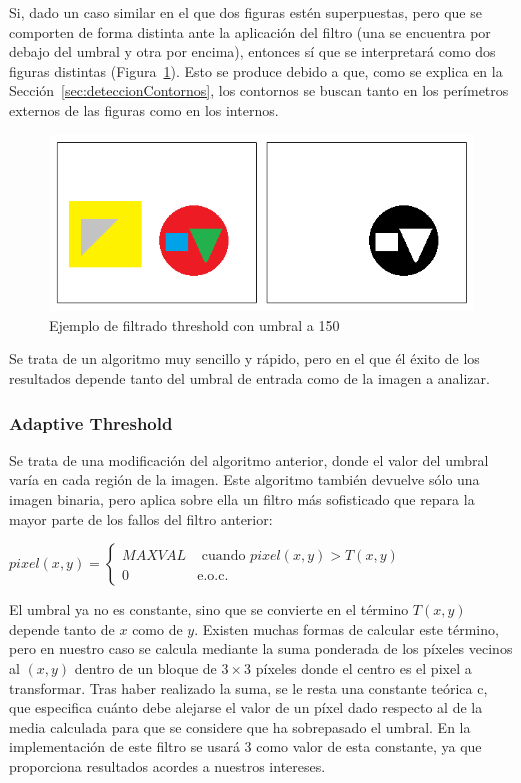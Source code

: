 {	Si, dado un caso similar en el que dos figuras estén superpuestas, pero que se comporten de forma distinta ante la aplicación del filtro (una se encuentra por debajo del umbral y otra por encima), entonces sí que se interpretará como dos figuras distintas (Figura~\ref{fig:threshold2}). Esto se produce debido a que, como se explica en la Sección~\ref{sec:deteccionContornos}, los contornos se buscan tanto en los perímetros externos de las figuras como en los internos.
	
		\begin{figure}[!htbp]
		\centering
		\includegraphics[scale=0.47]{graphics/threshold2.png}
		\caption{Ejemplo de filtrado threshold con umbral a 150}
		\label{fig:threshold2}
		\end{figure}
		
	Se trata de un algoritmo muy sencillo y rápido, pero en el que él éxito de los resultados depende tanto del umbral de entrada como de la imagen a analizar.
		
	\subsubsection{Adaptive Threshold}
	
	Se trata de una modificación del algoritmo anterior, donde el valor del umbral varía en cada región de la imagen. Este algoritmo también devuelve sólo una imagen binaria, pero aplica sobre ella un filtro más sofisticado que repara la mayor parte de los fallos del filtro anterior:

	\begin{center}
		$pixel(x,y) = \left\{
		\begin{array}{cc}
		MAXVAL 	& \text{ cuando } pixel(x,y) > T(x,y)\\ 
		0 	    & 	\text{e.o.c.}
		\end{array}\right.$
	\end{center}
	
	El umbral ya no es constante, sino que se convierte en el término $T(x,y)$ depende tanto de $x$ como de $y$. Existen muchas formas de calcular este término, pero en nuestro caso se calcula mediante la suma ponderada de los píxeles vecinos al $(x,y)$ dentro de un bloque de $3\times3$ píxeles donde el centro es el pixel a transformar. \color{blue}Tras haber realizado la suma, se le resta una constante teórica c, que especifica cuánto debe alejarse el valor de un píxel dado respecto al de la media calculada para que se considere que ha sobrepasado el umbral. En la implementación de este filtro se usará 3 como valor de esta constante, ya que proporciona resultados acordes a nuestros intereses.\color{black}
	
}
